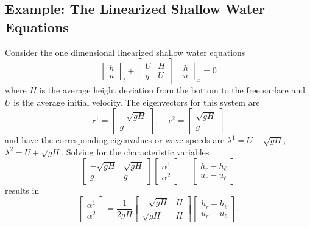 \documentclass[twoside]{bsu-ms}
\begin{document}
\subsection{Example: The Linearized Shallow Water Equations}\label{subsec:2.2.1}
Consider the one dimensional linearized shallow water equations
\begin{equation}\label{eq:2.24}
    \begin{bmatrix}
        h\\
        u
    \end{bmatrix}_{t}+\begin{bmatrix}
        U&H\\
        g&U
    \end{bmatrix}\begin{bmatrix}
        h\\
        u
    \end{bmatrix}_{x}=0
\end{equation}
where $H$ is the average height deviation from the bottom to the free surface and $U$ is the average initial velocity. The eigenvectors for this system are
$$\mathbf{r}^{1}=\begin{bmatrix}
    -\sqrt{gH}\\
    g
\end{bmatrix},\quad \mathbf{r}^{2}=\begin{bmatrix}
    \sqrt{gH}\\
    g
\end{bmatrix}$$
and have the corresponding eigenvalues or wave speeds are $\lambda^{1}=U-\sqrt{gH}$, $\lambda^{2}=U+\sqrt{gH}$. Solving for the characteristic variables
\begin{equation}\label{eq:2.25}
    \begin{bmatrix}
        -\sqrt{gH}&\sqrt{gH}\\
        g&g
    \end{bmatrix}\begin{bmatrix}
        \alpha^{1}\\
        \alpha^{2}
    \end{bmatrix}=\begin{bmatrix}
        h_{r}-h_{\ell}\\
        u_{r}-u_{\ell}
    \end{bmatrix}
\end{equation}
results in 
\begin{equation}\label{eq:2.26}
    \begin{bmatrix}
        \alpha^{1}\\
        \alpha^{2}
    \end{bmatrix}=\frac{1}{2gH}\begin{bmatrix}
        -\sqrt{gH}&H\\
        \sqrt{gH}&H
    \end{bmatrix}\begin{bmatrix}
        h_{r}-h_{\ell}\\
        u_{r}-u_{\ell}
    \end{bmatrix}.
\end{equation}
\end{document}
